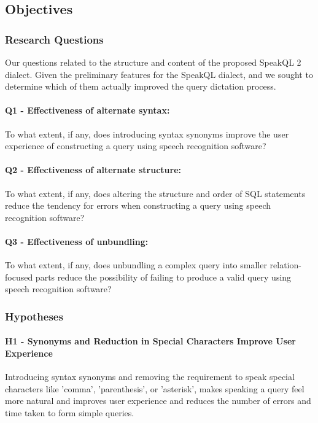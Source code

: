 \subsection{Objectives}

\subsubsection{Research Questions}

Our questions related to the structure and content of the proposed SpeakQL 2 dialect. Given the preliminary features for the SpeakQL dialect, and we sought to determine which of them actually improved the query dictation process.

\paragraph{Q1 - Effectiveness of alternate syntax:} To what extent, if any, does introducing syntax synonyms improve the user experience of constructing a query using speech recognition software?

\paragraph{Q2 - Effectiveness of alternate structure:} To what extent, if any, does altering the structure and order of SQL statements reduce the tendency for errors when constructing a query using speech recognition software?

\paragraph{Q3 - Effectiveness of unbundling:} To what extent, if any, does unbundling a complex query into smaller relation-focused parts reduce the possibility of failing to produce a valid query using speech recognition software?

\subsubsection{Hypotheses}

\paragraph{H1 - Synonyms and Reduction in Special Characters Improve User Experience} Introducing syntax synonyms and removing the requirement to speak special characters like 'comma', 'parenthesis', or 'asterisk', makes speaking a query feel more natural and improves user experience and reduces the number of errors and time taken to form simple queries.

